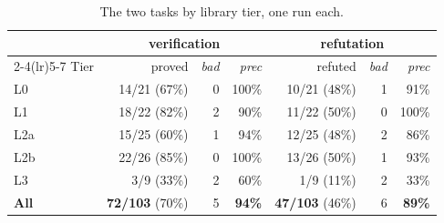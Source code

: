 \begin{table}[t]\centering\footnotesize
\caption{The two tasks by library tier, one run each.}
\label{tab:tiers-final}
\begin{tabular}{lrrrrrr}
\toprule
& \multicolumn{3}{c}{verification} & \multicolumn{3}{c}{refutation} \\
\cmidrule(lr){2-4}\cmidrule(lr){5-7}
Tier & proved & \emph{bad} & \emph{prec} &
refuted & \emph{bad} & \emph{prec} \\
\midrule
L0 & 14/21 (67\%) & 0 & 100\% & 10/21 (48\%) & 1 & 91\% \\
L1 & 18/22 (82\%) & 2 & 90\% & 11/22 (50\%) & 0 & 100\% \\
L2a & 15/25 (60\%) & 1 & 94\% & 12/25 (48\%) & 2 & 86\% \\
L2b & 22/26 (85\%) & 0 & 100\% & 13/26 (50\%) & 1 & 93\% \\
L3 & 3/9 (33\%) & 2 & 60\% & 1/9 (11\%) & 2 & 33\% \\
\midrule
\textbf{All} & \textbf{72/103} (70\%) & 5 & \textbf{94\%} & \textbf{47/103} (46\%) & 6 & \textbf{89\%} \\
\bottomrule
\end{tabular}
\end{table}
